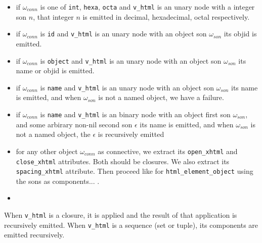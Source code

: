 \begin{itemize}

\item if $\omega_{conn}$ is one of \texttt{int}, \texttt{hexa},
  \texttt{octa} and \texttt{v\_html} is an unary node with a integer
  son $n$, that integer $n$ is emitted in decimal, hexadecimal, octal respectively.

\item if $\omega_{conn}$ is \texttt{id} and \texttt{v\_html} is an unary node with an object son $\omega_{son}$ its objid is emitted.
\item if $\omega_{conn}$ is \texttt{object} and \texttt{v\_html} is an unary node with an object son $\omega_{son}$ its name or objid is emitted.
\item if $\omega_{conn}$ is \texttt{name} and \texttt{v\_html} is an
  unary node with an object son $\omega_{son}$ its name is emitted,
  and when $\omega_{son}$ is not a named object, we have a failure.
\item if $\omega_{conn}$ is \texttt{name} and \texttt{v\_html} is an
  binary node with an object first son $\omega_{son}$, and some arbirary non-nil second son $\epsilon$ its name is emitted,
  and when $\omega_{son}$ is not a named object, the $\epsilon$ is recursively emitted
\item for any other object $\omega_{conn}$ as connective, we extract
  its \texttt{open\_xhtml} and \texttt{close\_xhtml} attributes. Both
  should be closures. We also extract its \texttt{spacing\_xhtml}
  attribute. Then proceed like for \texttt{html\_element\_object}
  using the sons as components... {\color{red}{@@ not sure @@}}.
\item {\color{red}{@@ to be completed a lot.}}
  
\end{itemize}


When \texttt{v\_html} is a closure, it is applied {\color{red}{@@ to
    be completed}} and the result of that application is recursively
emitted. When \texttt{v\_html} is a sequence (set or tuple), its
components are emitted recursively.

